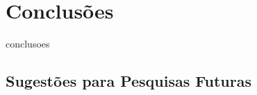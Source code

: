 \chapter{Conclusões}
\label{cap:conclusoes}

conclusoes

\section{Sugestões para Pesquisas Futuras} 

